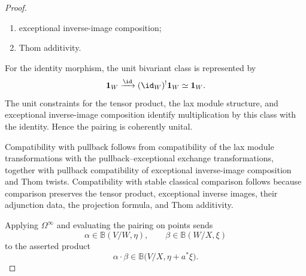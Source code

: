 \begin{proof}
\begin{enumerate}
    \item exceptional inverse-image composition;

    \item Thom additivity.
\end{enumerate}

For the identity morphism, the unit bivariant class is represented by
\[
    \mathbf1_W
    \xrightarrow{\id}
    (\id_W)^!\mathbf1_W
    \simeq
    \mathbf1_W.
\]
The unit constraints for the tensor product, the lax module structure, and
exceptional inverse-image composition identify multiplication by this
class with the identity.  Hence the pairing is coherently unital.

Compatibility with pullback follows from compatibility of the lax module
transformations with the pullback--exceptional exchange transformations,
together with pullback compatibility of exceptional inverse-image
composition and Thom twists.  Compatibility with stable classical
comparison follows because comparison preserves the tensor product,
exceptional inverse images, their adjunction data, the projection formula,
and Thom additivity.

Applying \(\Omega^\infty\) and evaluating the pairing on points sends
\[
    \alpha\in\mathbb B(V/W,\eta),
    \qquad
    \beta\in\mathbb B(W/X,\xi)
\]
to the asserted product
\[
    \alpha\cdot\beta
    \in
    \mathbb B
    \bigl(
      V/X,
      \eta+a^*\xi
    \bigr).
\]
\end{proof}

